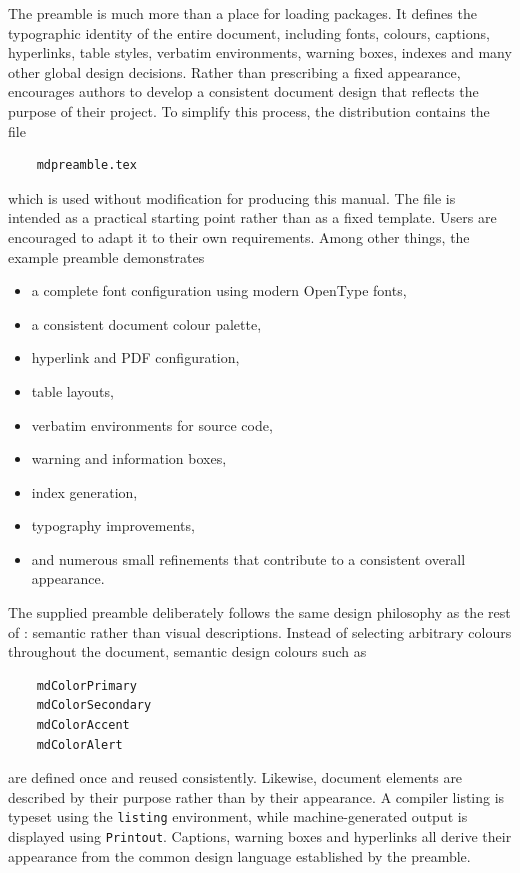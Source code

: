 \documentclass[
11pt,
a4paper,
oneside
]{scrbook}
\begin{document}
The preamble is much more than a place for loading packages. It defines
the typographic identity of the entire document, including fonts,
colours, captions, hyperlinks, table styles, verbatim environments,
warning boxes, indexes and many other global design decisions.
Rather than prescribing a fixed appearance, \mdlayout{} encourages
authors to develop a consistent document design that reflects the purpose
of their project.
To simplify this process, the distribution contains the file
\begin{verbatim}
	mdpreamble.tex
\end{verbatim}
which is used without modification for producing this manual.
The file is intended as a practical starting point rather than as a fixed
template. Users are encouraged to adapt it to their own requirements.
Among other things, the example preamble demonstrates
\begin{itemize}
	\item a complete font configuration using modern OpenType fonts,
	\item a consistent document colour palette,
	\item hyperlink and PDF configuration,
	\item table layouts,
	\item verbatim environments for source code,
	\item warning and information boxes,
	\item index generation,
	\item typography improvements,
	\item and numerous small refinements that contribute to a consistent
	overall appearance.
\end{itemize}
The supplied preamble deliberately follows the same design philosophy as
the rest of \mdlayout{}: semantic rather than visual descriptions.
Instead of selecting arbitrary colours throughout the document, semantic
design colours such as
\begin{verbatim}
	mdColorPrimary
	mdColorSecondary
	mdColorAccent
	mdColorAlert
\end{verbatim}
are defined once and reused consistently.
Likewise, document elements are described by their purpose rather than by
their appearance. A compiler listing is typeset using the
\texttt{listing} environment, while machine-generated output is displayed
using \texttt{Printout}. Captions, warning boxes and hyperlinks all
derive their appearance from the common design language established by
the preamble.
\end{document}
